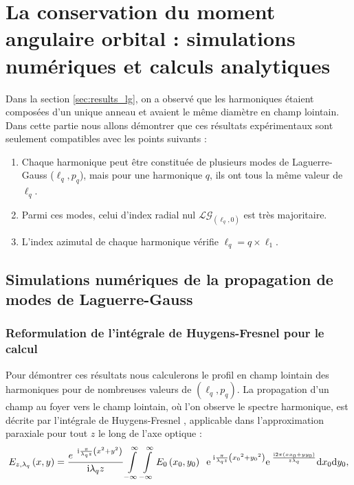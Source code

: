 \section{La conservation du moment angulaire orbital : simulations numériques et calculs analytiques}

Dans la section \ref{sec:results_lg}, on a observé que les harmoniques étaient composées d'un unique anneau et avaient le même diamètre en champ lointain. Dans cette partie nous allons démontrer que ces résultats expérimentaux sont seulement compatibles avec les points suivants :
\begin{enumerate}
\item Chaque harmonique peut être constituée de plusieurs modes de Laguerre-Gauss ($\ell_q,p_q$), mais pour une harmonique $q$, ils ont tous la même valeur de $\ell_q$.
\item Parmi ces modes, celui d'index radial nul $\mathcal{LG}_{(\ell_q,0)}$ est très majoritaire.
\item L'index azimutal de chaque harmonique vérifie $\ell_q=q\times\ell_1$.
\label{enum:properties}
\end{enumerate}

\subsection{Simulations numériques de la propagation de modes de Laguerre-Gauss}
\subsubsection{Reformulation de l'intégrale de Huygens-Fresnel pour le calcul}
Pour démontrer ces résultats nous calculerons le profil en champ lointain des harmoniques pour de nombreuses valeurs de $(\ell_q,p_q)$. La propagation d'un champ au foyer vers le champ lointain, où l'on observe le spectre harmonique, est décrite par l'intégrale de Huygens-Fresnel , applicable dans l'approximation paraxiale pour tout $z$ le long de l'axe optique :
	\begin{equation*}
	{E_{z,{\lambda _q}}}\left( {x,y} \right) = \frac{{{e^{\;\;\mathrm{i}\frac{{\pi }}{{{\lambda _q}z}}\left( {{x^2} + {y^2}} \right)}}}}{{\mathrm{i}{\lambda _q}z}}\int \limits_{ - \infty }^\infty \int \limits_{ - \infty }^\infty  {E_0}\left( {{x_0},{y_0}} \right)\;\;{{\mathrm{e}}^{\;\mathrm{i}\frac{\pi }{{{\lambda _q}z}}\left( {{x_0}^2 + {y_0}^2} \right)}}{{\mathrm{e}}^{\;\frac{{ \mathrm{i} 2{\pi}\left( {x{x_0} + y{y_0}} \right)}}{{z{\lambda _q}}}}}{\mathrm{d}}{x_0}{\mathrm{d}}{y_0},
	\end{equation*}

